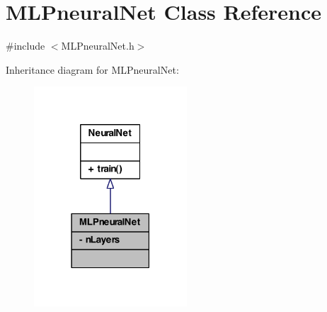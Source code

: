 \hypertarget{class_m_l_pneural_net}{
\section{MLPneuralNet Class Reference}
\label{class_m_l_pneural_net}
}


{\ttfamily \#include $<$MLPneuralNet.h$>$}



Inheritance diagram for MLPneuralNet:
\nopagebreak
\begin{figure}[H]
\begin{center}
\leavevmode
\includegraphics[width=162pt]{class_m_l_pneural_net__inherit__graph}
\end{center}
\end{figure}


